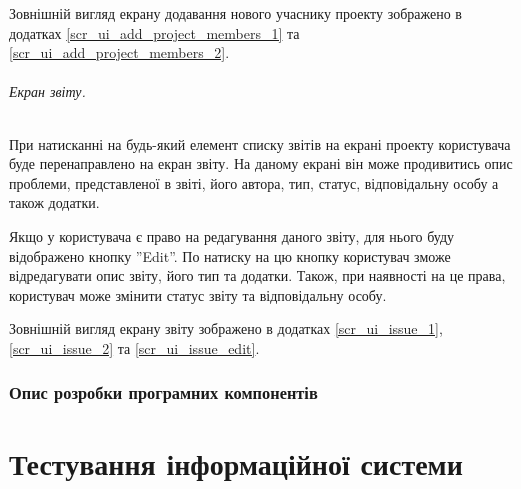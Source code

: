 \documentclass[../main.tex]{subfiles}
\begin{document}
Зовнішній вигляд екрану додавання нового учаснику проекту зображено в додатках \ref{scr_ui_add_project_members_1} та \ref{scr_ui_add_project_members_2}.

\subparagraph{Екран звіту.}

При натисканні на будь-який елемент списку звітів на екрані проекту користувача буде перенаправлено на екран звіту. На даному екрані він може продивитись опис проблеми, представленої в звіті, його автора, тип, статус, відповідальну особу а також додатки.

Якщо у користувача є право на редагування даного звіту, для нього буду відображено кнопку ''Edit''. По натиску на цю кнопку користувач зможе відредагувати опис звіту, його тип та додатки. Також, при наявності на це права, користувач може змінити статус звіту та відповідальну особу.

Зовнішній вигляд екрану звіту зображено в додатках \ref{scr_ui_issue_1}, \ref{scr_ui_issue_2} та \ref{scr_ui_issue_edit}.

\subsection{Опис розробки програмних компонентів}

\chapter{Тестування інформаційної системи}

\end{document}
